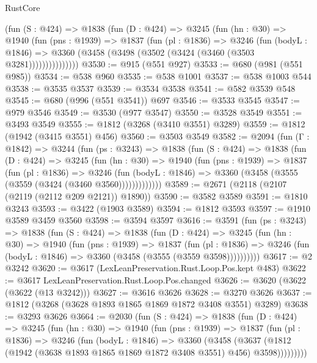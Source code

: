 \begin{lexlean}{RustCore}
\begin{coremodule}
          (fun (S : @424) =>
          @1838
            (fun (D : @424) =>
            @3245
              (fun (hn : @30) =>
              @1940
                (fun (pns : @1939) =>
                @1837
                  (fun (pl : @1836) =>
                  @3246
                    (fun (bodyL : @1846) =>
                    @3360 (@3458 (@3498 (@3502 (@3424 (@3460 (@3503 @3281)))))))))))))))
@3530 := @915 (@551 @927)
@3533 := @680 (@981 (@551 @985))
@3534 := @538 @960
@3535 := @538 @1001
@3537 := @538 @1003 @544
@3538 := @3535 @3537
@3539 := @3534 @3538
@3541 := @582 @3539 @548
@3545 := @680 (@996 (@551 @3541)) @697
@3546 := @3533 @3545
@3547 := @979 @3546
@3549 := @3530 (@977 @3547)
@3550 := @3528 @3549
@3551 := @3493 @3549
@3555 := @1812 (@3268 (@3410 @3551) @3289)
@3559 := @1812 (@1942 (@3415 @3551) @456)
@3560 := @3503 @3549
@3582 := @2094
    (fun (Γ : @1842) =>
    @3244
      (fun (ps : @3243) =>
      @1838
        (fun (S : @424) =>
        @1838
          (fun (D : @424) =>
          @3245
            (fun (hn : @30) =>
            @1940
              (fun (pns : @1939) =>
              @1837
                (fun (pl : @1836) =>
                @3246
                  (fun (bodyL : @1846) =>
                  @3360 (@3458 (@3555 (@3559 (@3424 (@3460 @3560)))))))))))))
@3589 := @2671 (@2118 (@2107 (@2119 (@2112 @209 @2121)) @1890))
@3590 := @3582 @3589
@3591 := @1810 @3243
@3593 := @3422 (@1903 @3589)
@3594 := @1812 @3593
@3597 := @1910 @3589 @3459 @3560
@3598 := @3594 @3597
@3616 := @3591
    (fun (ps : @3243) =>
    @1838
      (fun (S : @424) =>
      @1838
        (fun (D : @424) =>
        @3245
          (fun (hn : @30) =>
          @1940
            (fun (pns : @1939) =>
            @1837
              (fun (pl : @1836) =>
              @3246 (fun (bodyL : @1846) => @3360 (@3458 (@3555 (@3559 @3598))))))))))
@3617 := @2 @3242
@3620 := @3617 (LexLeanPreservation.Rust.Loop.Pos.kept @483)
@3622 := @3617 LexLeanPreservation.Rust.Loop.Pos.changed
@3626 := @3620 (@3622 (@3622 (@13 @3242)))
@3627 := @3616 @3626
@3628 := @3270 @3626
@3637 := @1812 (@3268 (@3628 @1893 @1865 @1869 @1872 @3408 @3551) @3289)
@3638 := @3293 @3626
@3664 := @2030
    (fun (S : @424) =>
    @1838
      (fun (D : @424) =>
      @3245
        (fun (hn : @30) =>
        @1940
          (fun (pns : @1939) =>
          @1837
            (fun (pl : @1836) =>
            @3246
              (fun (bodyL : @1846) =>
              @3360
                (@3458
                  (@3637
                    (@1812 (@1942 (@3638 @1893 @1865 @1869 @1872 @3408 @3551) @456) @3598)))))))))

\end{coremodule}
\end{lexlean}

